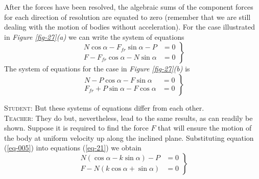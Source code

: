 \documentclass[a4paper,sfsidenotes]{tufte-book}
\begin{document}
After the forces have been resolved, the algebraic sums of the component forces for each direction of resolution are equated to zero (remember that we are still dealing with the motion of bodies without acceleration). For the case illustrated in \emph{Figure \ref{fig-27}(a)} we can write the system of equations
\begin{equation} 
\left.
\begin{split}
N \cos \alpha -F_{fr} \sin \alpha- P & = 0 \\
F - F_{fr} \cos \alpha - N \sin \alpha & = 0
\label{eq-21}
\end{split}
\right\}
\end{equation}
The system of equations for the case in \emph{Figure \ref{fig-27}(b)} is
\begin{equation} 
\left.
\begin{split}
N  - P \cos \alpha -F \sin \alpha & = 0 \\
F_{fr} + P \sin \alpha - F \cos \alpha & = 0
\label{eq-22}
\end{split}
\right\}
\end{equation}

\textsc{Student:} But these systems of equations differ from each other.
\\
\textsc{Teacher:} They do but, nevertheless, lead to the same results, as can readily be shown. Suppose it is required to find the force $F$ that will ensure the motion of the body at uniform
velocity up along the inclined plane. Substituting equation (\ref{eq-005}) into equations (\ref{eq-21}) we obtain
\begin{equation*} 
\left.
\begin{split}
N  \left( \cos \alpha - k \sin \alpha \right)  - P & = 0 \\
F  - N \left( k \cos \alpha + \sin \alpha \right) & = 0
\end{split}
\right\}
\end{equation*}
\end{document}
